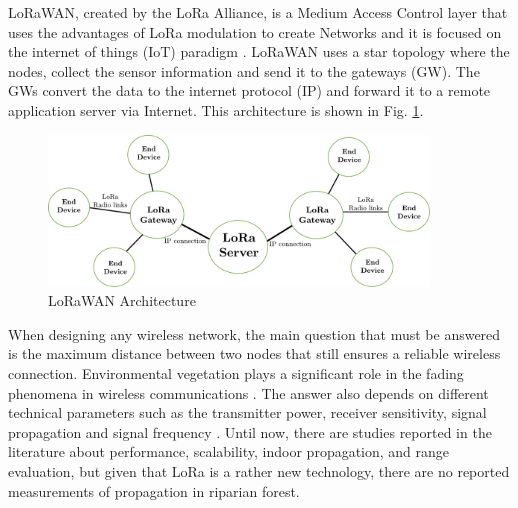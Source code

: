 LoRaWAN, created by the LoRa Alliance, is a Medium Access Control layer that uses the advantages of LoRa modulation to create Networks and it is focused on the internet of things (IoT) paradigm \cite{Wixted2017}. LoRaWAN uses a star topology where the nodes, collect the sensor information and send it to the gateways (GW). The GWs convert the data to the internet protocol (IP) and forward it to a remote application server via Internet. This architecture is shown in Fig. \ref{fig:lorawanarchitecture}.

\begin{figure}[h!]
  \centering
  \includegraphics[width=0.9\textwidth]{./figures/Figure1/Figure1.pdf}
  \caption{LoRaWAN Architecture \cite{Vangelista2015}}
  \label{fig:lorawanarchitecture}
\end{figure}


When designing any wireless network, the main question that must be answered is the maximum distance between two nodes that still ensures a reliable wireless connection. Environmental vegetation plays a significant role in the fading phenomena in wireless communications \cite{Meng2008}. The answer also depends on different technical parameters such as the transmitter power, receiver sensitivity, signal propagation and signal frequency \cite{Harvanova2011}. Until now, there are studies reported in the literature about performance, scalability, indoor propagation, and range evaluation, but given that LoRa is a rather new technology, there are no reported measurements of propagation in riparian forest.


